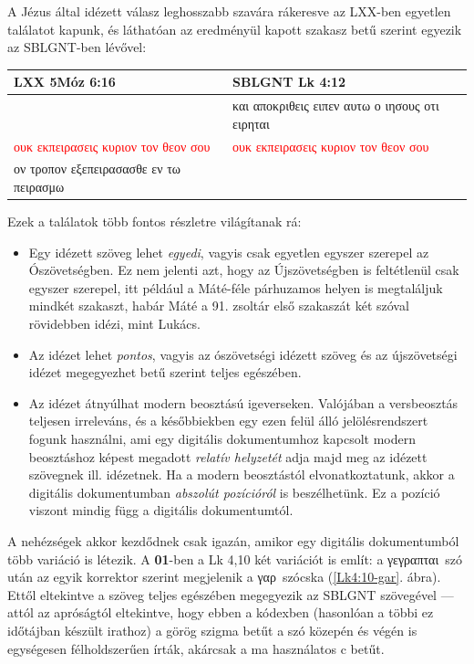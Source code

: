 \documentclass{article}
\newcommand\gr{\selectlanguage{greek}\frenchspacing}
\newcommand\hu{\selectlanguage{magyar}\frenchspacing}
\begin{document}
A Jézus által idézett válasz leghosszabb szavára rákeresve az LXX-ben egyetlen találatot kapunk,
és láthatóan az eredményül kapott szakasz betű szerint egyezik az SBLGNT-ben lévővel:
\begin{center}
\begin{tabular}{p{5cm} p{5cm}}
LXX 5Móz 6:16 & SBLGNT Lk 4:12\\
\hline
& {\gr και αποκριθεις ειπεν αυτω ο ιησους οτι ειρηται}\\
\gr \textcolor{red}{ουκ εκπειρασεις κυριον τον θεον σου} &
\gr \textcolor{red}{ουκ εκπειρασεις κυριον τον θεον σου} \\
\gr ον τροπον εξεπειρασασθε εν τω πειρασμω &
\end{tabular}
\end{center}
\hu
Ezek a találatok több fontos részletre világítanak rá:
\begin{itemize}
\item Egy idézett szöveg lehet \textit{egyedi}, vagyis csak egyetlen egyszer szerepel
az Ószövetségben. Ez nem jelenti azt, hogy az Újszövetségben is feltétlenül csak egyszer szerepel, itt például
a Máté-féle párhuzamos helyen is megtaláljuk mindkét szakaszt, habár Máté a 91. zsoltár első szakaszát
két szóval rövidebben idézi, mint Lukács.
\item Az idézet lehet \textit{pontos}, vagyis az ószövetségi idézett szöveg és az újszövetségi idézet megegyezhet
betű szerint teljes egészében.
\item Az idézet átnyúlhat modern beosztású igeverseken. Valójában a versbeosztás teljesen irreleváns,
és a későbbiekben egy ezen felül álló jelölésrendszert fogunk használni, ami egy digitális dokumentumhoz kapcsolt
modern beosztáshoz képest megadott \textit{relatív helyzetét} adja majd meg az idézett szövegnek ill. idézetnek.
Ha a modern beosztástól elvonatkoztatunk, akkor a digitális dokumentumban \textit{abszolút pozícióról} is beszélhetünk.
Ez a pozíció viszont mindig függ a digitális dokumentumtól.
\end{itemize}

A nehézségek akkor kezdődnek csak igazán, amikor egy digitális dokumentumból több variáció is létezik.
A \textbf{01}-ben a Lk 4,10 két variációt is említ: a \gr γεγραπται\hu\ szó után az egyik
korrektor szerint megjelenik a \gr γαρ\hu\ szócska (\ref{Lk4:10-gar}. ábra). Ettől eltekintve a szöveg
teljes egészében megegyezik az SBLGNT szövegével --- attól az apróságtól eltekintve, hogy ebben a kódexben
(hasonlóan a többi ez időtájban készült irathoz) a görög szigma betűt a szó közepén és végén is
egységesen félholdszerűen írták, akárcsak a ma használatos c betűt.
\end{document}
